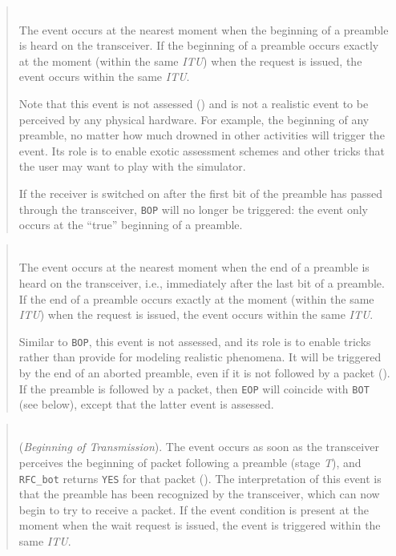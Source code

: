 \begin{quote}
\noindent{}\\ \hspace{0in}
The event occurs at the nearest moment when the beginning of a preamble
is heard on the transceiver.
If the beginning of a preamble occurs exactly at the moment (within the
same {\em ITU\/}) when the request is issued, the event occurs within the
same {\em ITU}.

\medskip
Note that this event is not assessed () and is not a
realistic event to be perceived by any physical hardware.
For example, the beginning of any preamble, no matter how much
drowned in other activities will trigger the event.
Its role is to enable exotic assessment schemes and other tricks that the
user may want to play with the simulator.

\noindent
If the receiver is switched on after the first bit of the preamble has
passed through the transceiver, {\tt BOP} will no longer be triggered:
the event only occurs at the ``true'' beginning of a preamble.
\end{quote}

\begin{quote}
\noindent{}\\ \hspace{0in}
The event occurs at the nearest moment when the end of a preamble
is heard on the transceiver, i.e., immediately after the last bit
of a preamble.
If the end of a preamble occurs exactly at the moment (within the
same {\em ITU\/}) when the request is issued, the event occurs within the
same {\em ITU}.

\medskip
Similar to {\tt BOP}, this event is not assessed, and its role is to
enable tricks rather than provide for modeling realistic phenomena.
It will be triggered by the end of an aborted preamble,
even if it is not followed by a packet ().
If the preamble is followed by a packet, then {\tt EOP} will coincide with
{\tt BOT} (see below), except that the latter event is assessed.
\end{quote}

\begin{quote}
\noindent{}\\ \hspace{0in}
({\em Beginning of Transmission\/}).
The event occurs as soon as the transceiver perceives the beginning of packet
following a preamble (stage {\em T\/}),
and {\tt RFC\_bot} returns {\tt YES} for that packet
().
The interpretation of this event is that the preamble has been recognized
by the transceiver, which can now begin to try to receive a packet.
If the event condition is present at the moment when the wait request is
issued, the event is triggered within the same {\em ITU}.
\end{quote}

